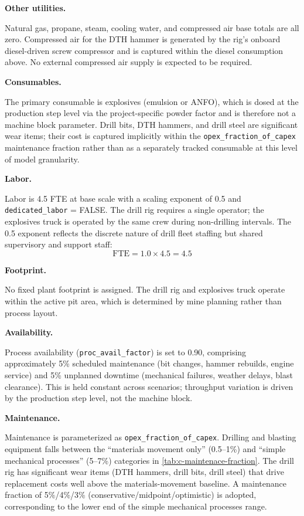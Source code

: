 \medskip
\noindent\textbf{Other utilities.}\quad

Natural gas, propane, steam, cooling water, and compressed air base totals are all zero. Compressed air for the DTH hammer is generated by the rig's onboard diesel-driven screw compressor and is captured within the diesel consumption above. No external compressed air supply is expected to be required.

\medskip
\noindent\textbf{Consumables.}\quad

The primary consumable is explosives (emulsion or ANFO), which is dosed at the production step level via the project-specific powder factor and is therefore not a machine block parameter. Drill bits, DTH hammers, and drill steel are significant wear items; their cost is captured implicitly within the \texttt{opex\_fraction\_of\_capex} maintenance fraction rather than as a separately tracked consumable at this level of model granularity.

\medskip
\noindent\textbf{Labor.}\quad

Labor is 4.5 FTE at base scale with a scaling exponent of 0.5 and \texttt{dedicated\_labor} = FALSE. The drill rig requires a single operator; the explosives truck is operated by the same crew during non-drilling intervals. The 0.5 exponent reflects the discrete nature of drill fleet staffing but shared supervisory and support staff:
\[
	\text{FTE} = 1.0 \times 4.5 = 4.5
\]

\medskip
\noindent\textbf{Footprint.}\quad

No fixed plant footprint is assigned. The drill rig and explosives truck operate within the active pit area, which is determined by mine planning rather than process layout.

\medskip
\noindent\textbf{Availability.}\quad

Process availability (\texttt{proc\_avail\_factor}) is set to 0.90, comprising approximately 5\% scheduled maintenance (bit changes, hammer rebuilds, engine service) and 5\% unplanned downtime (mechanical failures, weather delays, blast clearance). This is held constant across scenarios; throughput variation is driven by the production step level, not the machine block.

\medskip
\noindent\textbf{Maintenance.}\quad

Maintenance is parameterized as \texttt{opex\_fraction\_of\_capex}. Drilling and blasting equipment falls between the ``materials movement only'' (0.5--1\%) and ``simple mechanical processes'' (5--7\%) categories in \ref{tab:c-maintenace-fraction}. The drill rig has significant wear items (DTH hammers, drill bits, drill steel) that drive replacement costs well above the materials-movement baseline. A maintenance fraction of 5\%/4\%/3\% (conservative/midpoint/optimistic) is adopted, corresponding to the lower end of the simple mechanical processes range.

